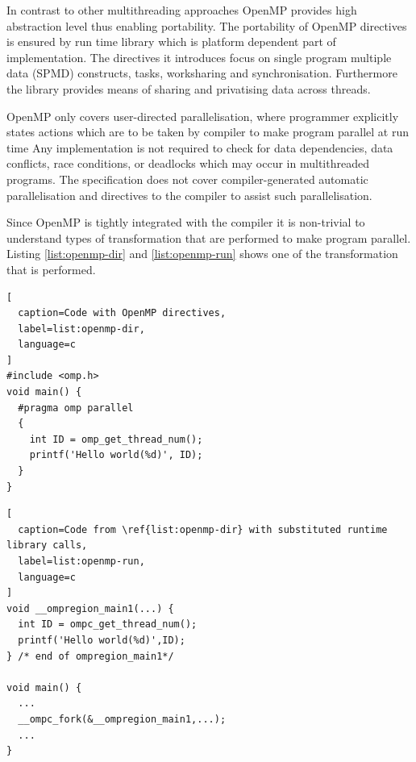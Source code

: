 \documentclass[12pt, a4paper]{report}
\begin{document}
In contrast to other multithreading approaches OpenMP provides high
abstraction level thus enabling portability. The portability of OpenMP directives
is ensured by run time library which is platform dependent part of implementation.
The directives it introduces focus on single program multiple data
(SPMD) constructs, tasks, worksharing and synchronisation.
Furthermore the library provides means of sharing and privatising
data across threads.

OpenMP only covers user-directed parallelisation, where programmer explicitly
states actions which are to be taken by compiler to make program parallel at run time
Any implementation is not required to check for data dependencies, data conflicts,
race conditions, or deadlocks which may occur in multithreaded programs.
The specification does not cover compiler-generated automatic parallelisation and
directives to the compiler to assist such parallelisation.

Since OpenMP is tightly integrated with the compiler it is non-trivial to
understand types of transformation that are performed to make program parallel.
Listing \ref{list:openmp-dir} and \ref{list:openmp-run} shows one of the transformation that is performed.

\begin{lstlisting}[
  caption=Code with OpenMP directives,
  label=list:openmp-dir,
  language=c
]
#include <omp.h>
void main() {
  #pragma omp parallel
  {
    int ID = omp_get_thread_num();
    printf('Hello world(%d)', ID);
  }
}
\end{lstlisting}

\begin{lstlisting}[
  caption=Code from \ref{list:openmp-dir} with substituted runtime library calls,
  label=list:openmp-run,
  language=c
]
void __ompregion_main1(...) {
  int ID = ompc_get_thread_num();
  printf('Hello world(%d)',ID);
} /* end of ompregion_main1*/

void main() {
  ...
  __ompc_fork(&__ompregion_main1,...);
  ...
}
\end{lstlisting}
\end{document}
